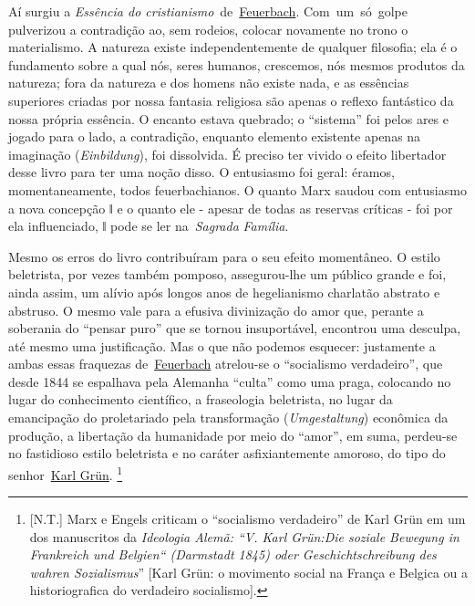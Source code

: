 Aí surgiu a \protect\hypertarget{r9}{}{}\emph{Essência do
cristianismo}~de~\href{https://www.marxists.org/portugues/dicionario/verbetes/f/feuerbach.htm}{Feuerbach}.
Com~um~só~golpe pulverizou a contradição ao, sem rodeios, colocar
novamente no trono o materialismo. A natureza existe independentemente
de qualquer filosofia; ela é o fundamento sobre a qual nós, seres
humanos, crescemos, nós mesmos produtos da natureza; fora da natureza e
dos homens não existe nada, e as essências superiores criadas por nossa
fantasia religiosa são apenas o reflexo fantástico da nossa própria
essência. O encanto estava quebrado; o ``sistema'' foi pelos ares e
jogado para o lado, a contradição, enquanto elemento existente apenas na
imaginação (\emph{Einbildung}), foi dissolvida. É preciso ter vivido o
efeito libertador desse livro para ter uma noção disso. O entusiasmo foi
geral: éramos, momentaneamente, todos feuerbachianos. O quanto Marx
saudou com entusiasmo a nova concepção ǁ e o quanto ele - apesar de
todas as reservas críticas - foi por ela influenciado, ǁ pode se ler
na~\emph{Sagrada} \protect\hypertarget{r10}{}{}\emph{Família}.

Mesmo os erros do livro contribuíram para o seu efeito momentâneo. O
estilo beletrista, por vezes também pomposo, assegurou-lhe um público
grande e foi, ainda assim, um alívio após longos anos de hegelianismo
charlatão abstrato e abstruso. O mesmo vale para a efusiva divinização
do amor que, perante a soberania do ``pensar puro'' que se tornou
insuportável, encontrou uma desculpa, até mesmo uma justificação. Mas o
que não podemos esquecer: justamente a ambas essas fraquezas
de~\href{https://www.marxists.org/portugues/dicionario/verbetes/f/feuerbach.htm}{Feuerbach}
atrelou-se o ``socialismo verdadeiro'', que desde 1844 se espalhava pela
Alemanha ``culta'' como uma praga, colocando no lugar do conhecimento
científico, a fraseologia beletrista, no lugar da emancipação do
proletariado pela transformação (\emph{Umgestaltung}) econômica da
produção, a libertação da humanidade por meio do ``amor'', em suma,
perdeu-se no fastidioso estilo beletrista e no caráter asfixiantemente
amoroso, do tipo do
senhor~\href{https://www.marxists.org/portugues/dicionario/verbetes/g/grun_karl.htm}{Karl
Grün}. \footnote{{[}N.T.{]} Marx e Engels criticam o ``socialismo
  verdadeiro'' de Karl Grün em um dos manuscritos da \emph{Ideologia
  Alemã: ``V. Karl Grün:Die soziale Bewegung in Frankreich und Belgien``
  (Darmstadt 1845) oder Geschichtschreibung des wahren Sozialismus}''
  {[}Karl Grün: o movimento social na França e Belgica ou a
  historiografica do verdadeiro socialismo{]}.}

